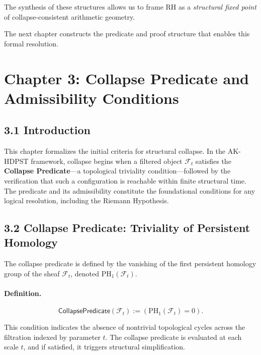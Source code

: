 \documentclass[11pt]{article}
\begin{document}
The synthesis of these structures allows us to frame RH as a \emph{structural fixed point} of collapse-consistent arithmetic geometry.

The next chapter constructs the predicate and proof structure that enables this formal resolution.



\section*{Chapter 3: Collapse Predicate and Admissibility Conditions}

\subsection*{3.1 Introduction}

This chapter formalizes the initial criteria for structural collapse. In the AK-HDPST framework, collapse begins when a filtered object \( \mathcal{F}_t \) satisfies the \textbf{Collapse Predicate}—a topological triviality condition—followed by the verification that such a configuration is reachable within finite structural time. The predicate and its admissibility constitute the foundational conditions for any logical resolution, including the Riemann Hypothesis.

\subsection*{3.2 Collapse Predicate: Triviality of Persistent Homology}

The collapse predicate is defined by the vanishing of the first persistent homology group of the sheaf \( \mathcal{F}_t \), denoted \( \mathrm{PH}_1(\mathcal{F}_t) \).

\paragraph{Definition.}
\[
\mathsf{CollapsePredicate}(\mathcal{F}_t) := \left( \mathrm{PH}_1(\mathcal{F}_t) = 0 \right).
\]

This condition indicates the absence of nontrivial topological cycles across the filtration indexed by parameter \( t \). The collapse predicate is evaluated at each scale \( t \), and if satisfied, it triggers structural simplification.
\end{document}
